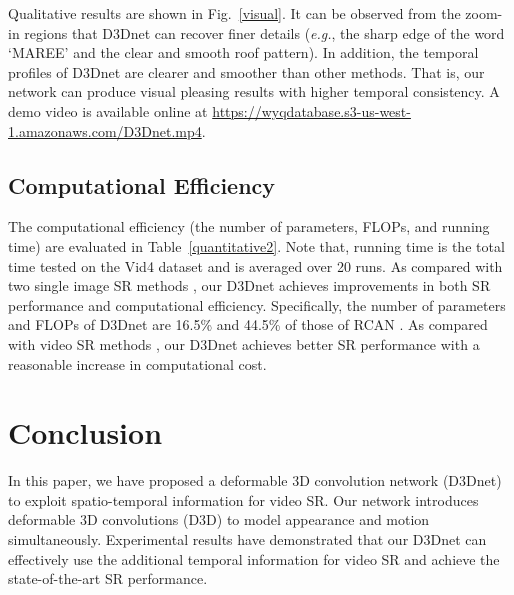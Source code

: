 \documentclass[journal]{IEEEtran}
\begin{document}
Qualitative results are shown in Fig.~\ref{visual}. It can be observed from the zoom-in regions that D3Dnet can recover finer details (\textit{e.g.}, the sharp edge of the word `MAREE' and the clear and smooth roof pattern). In addition, the temporal profiles of D3Dnet are clearer and smoother than other methods. That is, our network can produce visual pleasing results with higher temporal consistency. A demo video is available online at \url{https://wyqdatabase.s3-us-west-1.amazonaws.com/D3Dnet.mp4}.

\subsection{Computational Efficiency}

The computational efficiency (the number of parameters, FLOPs, and running time) are evaluated in Table~\ref{quantitative2}. Note that, running time is the total time tested on the Vid4  \cite{VESPCN} dataset and is averaged over 20 runs. As compared with two single image SR methods \cite{DBPN,RCAN}, our D3Dnet achieves improvements in both SR performance and computational efficiency. Specifically, the number of parameters and FLOPs of D3Dnet are 16.5\% and 44.5\% of those of RCAN \cite{RCAN}. As compared with video SR methods \cite{VSRnet,VESPCN,SOFVSR20,TDAN}, our D3Dnet achieves better SR performance with a reasonable increase in computational cost.

\section{Conclusion}\label{sec5}
In this paper, we have proposed a deformable 3D convolution network (D3Dnet) to exploit spatio-temporal information for video SR. Our network introduces deformable 3D convolutions (D3D) to model appearance and motion simultaneously. Experimental results have demonstrated that our D3Dnet can effectively use the additional temporal information for video SR and achieve the state-of-the-art SR performance.



\end{document}
